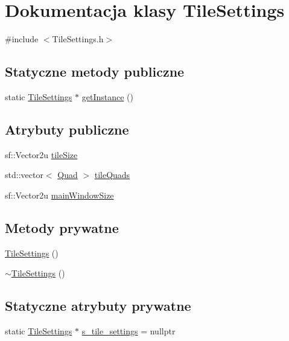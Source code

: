 \hypertarget{class_tile_settings}{}\section{Dokumentacja klasy Tile\+Settings}
\label{class_tile_settings}


{\ttfamily \#include $<$Tile\+Settings.\+h$>$}

\subsection*{Statyczne metody publiczne}
\begin{DoxyCompactItemize}
\item 
static \mbox{\hyperlink{class_tile_settings}{Tile\+Settings}} $\ast$ \mbox{\hyperlink{class_tile_settings_a003ae6e78b97855c8592b2b4c0818914}{get\+Instance}} ()
\end{DoxyCompactItemize}
\subsection*{Atrybuty publiczne}
\begin{DoxyCompactItemize}
\item 
sf\+::\+Vector2u \mbox{\hyperlink{class_tile_settings_ae4be54be3619d21d536ce13b7354f165}{tile\+Size}}
\item 
std\+::vector$<$ \mbox{\hyperlink{class_quad}{Quad}} $>$ \mbox{\hyperlink{class_tile_settings_ac37d7b95a1e2266d38de0a70a907efb3}{tile\+Quads}}
\item 
sf\+::\+Vector2u \mbox{\hyperlink{class_tile_settings_a2b24689813e0082b59df113b754778c2}{main\+Window\+Size}}
\end{DoxyCompactItemize}
\subsection*{Metody prywatne}
\begin{DoxyCompactItemize}
\item 
\mbox{\hyperlink{class_tile_settings_a5903073619b7b4bf85a2dc3548db84fe}{Tile\+Settings}} ()
\item 
\mbox{\hyperlink{class_tile_settings_a4e8a5a736c71cec9e60a49d5cafca150}{$\sim$\+Tile\+Settings}} ()
\end{DoxyCompactItemize}
\subsection*{Statyczne atrybuty prywatne}
\begin{DoxyCompactItemize}
\item 
static \mbox{\hyperlink{class_tile_settings}{Tile\+Settings}} $\ast$ \mbox{\hyperlink{class_tile_settings_a4e06ef1c8909d1e22f82976b9b4162f0}{s\+\_\+tile\+\_\+settings}} = nullptr
\end{DoxyCompactItemize}



